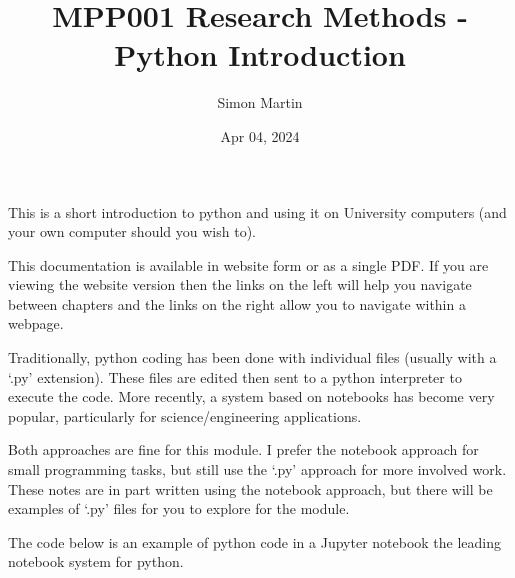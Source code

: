 \documentclass[letterpaper,10pt,english]{jupyterBook}
\title{MPP001 Research Methods - Python Introduction}
\date{Apr 04, 2024}
\author{Simon Martin}
\begin{document}
\pagestyle{empty}
\sphinxmaketitle
\pagestyle{plain}
\sphinxtableofcontents
\pagestyle{normal}
\label{\detokenize{IntroNB::doc}}


\sphinxAtStartPar
This is a short introduction to python and using it on University computers (and your own computer should you wish to).

\sphinxAtStartPar
This documentation is available in website form or as a single PDF. If you are viewing the website version then the links on the left will help you navigate between chapters and the links on the right allow you to navigate within a webpage.

\begin{DUlineblock}{0em}
\item[] 
\end{DUlineblock}

\sphinxAtStartPar
Traditionally, python coding has been done with individual files (usually with a ‘.py’ extension). These files are edited then sent to a python interpreter to execute the code. More recently, a system based on notebooks has become very popular, particularly for science/engineering applications.

\sphinxAtStartPar
Both approaches are fine for this module. I prefer the notebook approach for small programming tasks, but still use the ‘.py’ approach for more involved work. These notes are in part written using the notebook approach, but there will be examples of ‘.py’ files for you to explore for the module.

\sphinxAtStartPar
The code below is an example of python code in a Jupyter notebook \sphinxhyphen{} the leading notebook system for python.
\end{document}
